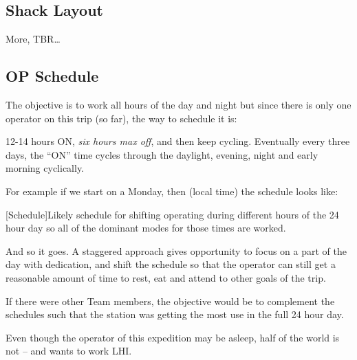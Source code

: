 \documentclass[11pt]{article}
\begin{document}
\subsection{Shack Layout}

More, TBR\ldots

\subsection{OP Schedule}

The objective is to work all hours of the day and night but since
there is only one operator on this trip (so far), the way to schedule it is:

\par
12-14 hours ON, {\textit{six hours max off}}, and then keep cycling.
Eventually every three days, the ``ON'' time cycles through the
daylight, evening, night and early morning cyclically.
\par
For example if we start on a Monday, then (local time) the schedule looks
like:
\vskip2mm
\noindent%
\begin{minipage}{\linewidth}%
\captionsetup{width=0.8\linewidth}
[Schedule]{Likely schedule for shifting operating during
different hours of the 24 hour day so all of the
dominant modes for those times are worked.}
\label{sked}
\end{minipage}
\vskip3mm

And so it goes. A staggered approach gives opportunity to focus on
a part of the day with dedication, and shift the schedule so that
the operator can still get a reasonable amount of time to rest, eat
and attend to other goals of the trip.
\par
If there were other Team members, the objective would be to complement
the schedules such that the station was getting the most use in the full
24 hour day.
\par
Even though the operator of this expedition may be asleep, half of the world
is not -- and wants to work LHI.
\end{document}
